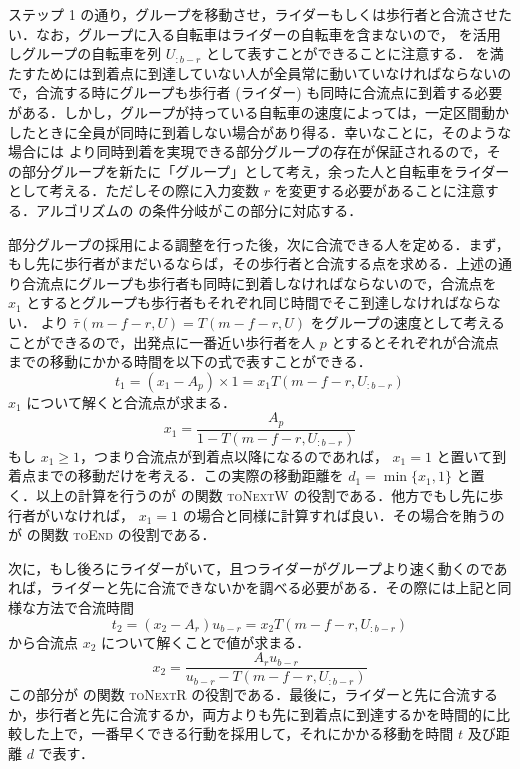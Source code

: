 ステップ 1 の通り，グループを移動させ，ライダーもしくは歩行者と合流させたい．なお，グループに入る自転車はライダーの自転車を含まないので，  を活用しグループの自転車を列 $U_{:b-r}$ として表すことができることに注意する．  を満たすためには到着点に到達していない人が全員常に動いていなければならないので，合流する時にグループも歩行者 (ライダー) も同時に合流点に到着する必要がある．しかし，グループが持っている自転車の速度によっては，一定区間動かしたときに全員が同時に到着しない場合があり得る．幸いなことに，そのような場合には  より同時到着を実現できる部分グループの存在が保証されるので，その部分グループを新たに「グループ」として考え，余った人と自転車をライダーとして考える．ただしその際に入力変数 $r$ を変更する必要があることに注意する．アルゴリズムの  の条件分岐がこの部分に対応する．

部分グループの採用による調整を行った後，次に合流できる人を定める．まず，もし先に歩行者がまだいるならば，その歩行者と合流する点を求める．上述の通り合流点にグループも歩行者も同時に到着しなければならないので，合流点を $x_1$ とするとグループも歩行者もそれぞれ同じ時間でそこ到達しなければならない．  より $\bar\tau(m - f - r, U) = T(m - f - r, U)$ をグループの速度として考えることができるので，出発点に一番近い歩行者を人 $p$ とするとそれぞれが合流点までの移動にかかる時間を以下の式で表すことができる．
\begin{equation}
  t_1 = (x_1 - A_p) \times 1 = x_1T(m - f - r, U_{:b-r})
\end{equation}
$x_1$ について解くと合流点が求まる．
\begin{equation}
  x_1 = \frac{A_p}{1 - T(m - f - r, U_{:b-r})}
\end{equation}
もし $x_1 \geq 1$，つまり合流点が到着点以降になるのであれば， $x_1 = 1$ と置いて到着点までの移動だけを考える．この実際の移動距離を $d_1 = \min \{x_1, 1\}$ と置く．以上の計算を行うのが  の関数 \textsc{toNextW} の役割である．他方でもし先に歩行者がいなければ， $x_1 = 1$ の場合と同様に計算すれば良い．その場合を賄うのが  の関数 \textsc{toEnd} の役割である．

次に，もし後ろにライダーがいて，且つライダーがグループより速く動くのであれば，ライダーと先に合流できないかを調べる必要がある．その際には上記と同様な方法で合流時間
\begin{equation}
  t_2 = (x_2 - A_r)u_{b - r} = x_2T(m - f - r, U_{:b-r})
\end{equation}
から合流点 $x_2$ について解くことで値が求まる．
\begin{equation}
  x_2 = \frac{A_ru_{b - r}}{u_{b-r} - T(m - f - r, U_{:b-r})}
\end{equation}
この部分が  の関数 \textsc{toNextR} の役割である．最後に，ライダーと先に合流するか，歩行者と先に合流するか，両方よりも先に到着点に到達するかを時間的に比較した上で，一番早くできる行動を採用して，それにかかる移動を時間 $t$ 及び距離 $d$ で表す．

